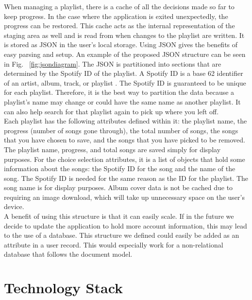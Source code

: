 \documentclass{article}
\begin{document}
\quad When managing a playlist, there is a cache of all the decisions made so far to keep progress. In the case where the application is exited unexpectedly, the progress can be restored. This cache acts as the internal representation of the staging area as well and is read from when changes to the playlist are written. It is stored as JSON in the user’s local storage. Using JSON gives the benefits of easy parsing and setup. An example of the proposed JSON structure can be seen in Fig. ~\ref{fig:jsondiagram}. The JSON is partitioned into sections that are determined by the Spotify ID of the playlist. A Spotify ID is a base 62 identifier of an artist, album, track, or playlist \cite{Spotify_docs}. The Spotify ID is guaranteed to be unique for each playlist. Therefore, it is the best way to partition the data because a playlist’s name may change or could have the same name as another playlist. It can also help search for that playlist again to pick up where you left off. \\

\quad Each playlist has the following attributes defined within it: the playlist name, the progress (number of songs gone through), the total number of songs, the songs that you have chosen to save, and the songs that you have picked to be removed. The playlist name, progress, and total songs are saved simply for display purposes. For the choice selection attributes, it is a list of objects that hold some information about the songs: the Spotify ID for the song and the name of the song. The Spotify ID is needed for the same reason as the ID for the playlist. The song name is for display purposes. Album cover data is not be cached due to requiring an image download, which will take up unnecessary space on the user’s device. \\

\quad A benefit of using this structure is that it can easily scale. If in the future we decide to update the application to hold more account information, this may lead to the use of a database. This structure we defined could easily be added as an attribute in a user record. This would especially work for a non-relational database that follows the document model. \\



\section{Technology Stack}
\end{document}

